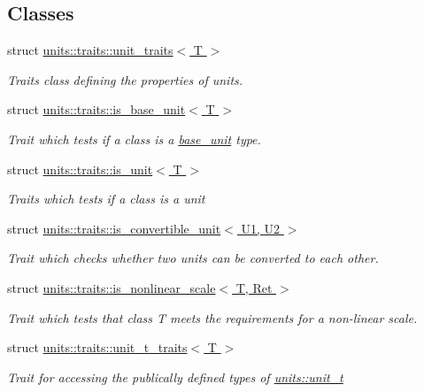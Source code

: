 \subsection*{Classes}
\begin{DoxyCompactItemize}
\item 
struct \hyperlink{structunits_1_1traits_1_1unit__traits}{units\+::traits\+::unit\+\_\+traits$<$ T $>$}
\begin{DoxyCompactList}\small\item\em Traits class defining the properties of units. \end{DoxyCompactList}\item 
struct \hyperlink{structunits_1_1traits_1_1is__base__unit}{units\+::traits\+::is\+\_\+base\+\_\+unit$<$ T $>$}
\begin{DoxyCompactList}\small\item\em Trait which tests if a class is a {\ttfamily \hyperlink{structunits_1_1base__unit}{base\+\_\+unit}} type. \end{DoxyCompactList}\item 
struct \hyperlink{structunits_1_1traits_1_1is__unit}{units\+::traits\+::is\+\_\+unit$<$ T $>$}
\begin{DoxyCompactList}\small\item\em Traits which tests if a class is a {\ttfamily unit} \end{DoxyCompactList}\item 
struct \hyperlink{structunits_1_1traits_1_1is__convertible__unit}{units\+::traits\+::is\+\_\+convertible\+\_\+unit$<$ U1, U2 $>$}
\begin{DoxyCompactList}\small\item\em Trait which checks whether two units can be converted to each other. \end{DoxyCompactList}\item 
struct \hyperlink{structunits_1_1traits_1_1is__nonlinear__scale}{units\+::traits\+::is\+\_\+nonlinear\+\_\+scale$<$ T, Ret $>$}
\begin{DoxyCompactList}\small\item\em Trait which tests that {\ttfamily class T} meets the requirements for a non-\/linear scale. \end{DoxyCompactList}\item 
struct \hyperlink{structunits_1_1traits_1_1unit__t__traits}{units\+::traits\+::unit\+\_\+t\+\_\+traits$<$ T $>$}
\begin{DoxyCompactList}\small\item\em Trait for accessing the publically defined types of {\ttfamily \hyperlink{classunits_1_1unit__t}{units\+::unit\+\_\+t}} \end{DoxyCompactList}\item 

\end{DoxyCompactItemize}
